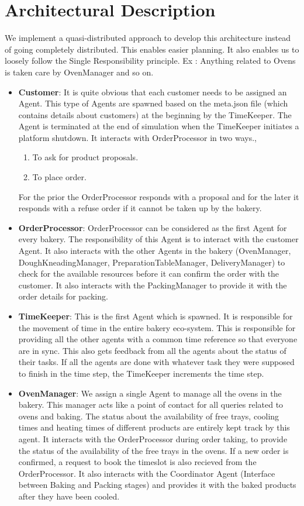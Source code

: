 \documentclass[12pt]{article}
\begin{document}
\section{Architectural Description}%
\label{sec:description}
We implement a quasi-distributed approach to develop this architecture instead of going completely distributed. This enables easier planning. It also enables us to loosely follow the Single Responsibility principle. Ex : Anything related to Ovens is taken care by OvenManager and so on.
\begin{itemize}
    \item \textbf{Customer}: It is quite obvious that each customer needs to be assigned an Agent. This type of Agents are spawned based on the meta.json file (which contains details about customers) at the beginning by the TimeKeeper. The Agent is terminated at the end of simulation when the TimeKeeper initiates a platform shutdown. It interacts with OrderProcessor in two ways.,
    \begin{enumerate}
    	\item To ask for product proposals.
    	\item To place order. 
    \end{enumerate}
    For the prior the OrderProcessor responds with a proposal and for the later it responds with a refuse order if it cannot be taken up by the bakery.
    \item \textbf{OrderProcessor}: OrderProcessor can be considered as the first Agent for every bakery. The responsibility of this Agent is to interact with the customer Agent. It also interacts with the other Agents in the bakery (OvenManager, DoughKneadingManager, PreparationTableManager, DeliveryManager) to check for the available resources before it can confirm the order with the customer. It also interacts with the PackingManager to provide it with the order details for packing.
    \item \textbf{TimeKeeper}: This is the first Agent which is spawned. It is responsible for the movement of time in the entire bakery eco-system. This is responsible for providing all the other agents with a common time reference so that everyone are in sync. This also gets feedback from all the agents about the status of their tasks. If all the agents are done with whatever task they were supposed to finish in the time step, the TimeKeeper increments the time step.
    \item \textbf{OvenManager}: We assign a single Agent to manage all the ovens in the bakery. This manager acts like a point of contact for all queries related to ovens and baking. The status about the availability of free trays, cooling times and heating times of different products are entirely kept track by this agent. It interacts with the OrderProcessor during order taking, to provide the status of the availability of the free trays in the ovens. If a new order is confirmed, a request to book the timeslot is also recieved from the OrderProcessor. It also interacts with the Coordinator Agent (Interface between Baking and Packing stages) and provides it with the baked products after they have been cooled.

\end{itemize}
\end{document}
